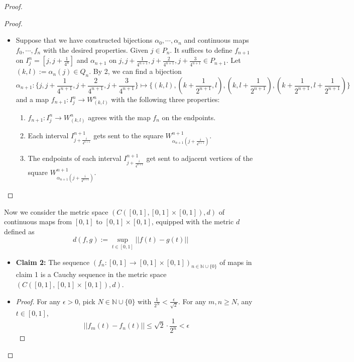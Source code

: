 \begin{proof}
\begin{itemize}
\begin{proof}
\begin{itemize}
                \item Suppose that we have constructed bijections $\alpha_0 ,\cdots, \alpha_n$ and continuous maps $f_0 ,\cdots, f_n$ with the desired properties. Given $j \in P_n$. It suffices to define $f_{n+1}$ on $I_j^n= [j,j+ \frac{1}{4^n}]$ and $\alpha_{n+1}$ on $j, j+\frac{1}{4^{n+1}}, j+\frac{2}{4^{n+1}}, j+\frac{3}{4^{n+1}} \in P_{n+1}$. Let $(k,l) := \alpha_n(j) \in Q_n$. By 2, we can find a bijection
                $$\alpha_{n+1} : \{ j, j+\frac{1}{4^{n+1}}, j+\frac{2}{4^{n+1}}, j+\frac{3}{4^{n+1}} \} \mapsto \{ (k,l),(k+ \frac{1}{2^{n+1}}, l),(k, l + \frac{1}{2^{n+1}}), (k+ \frac{1}{2^{n+1}}, l + \frac{1}{2^{n+1}}) \}$$
                and a map $f_{n+1}: I_j^n \to W_{(k,l)}^n$ with the following three properties:
                \begin{enumerate}[label=\Roman*]
                    \item $f_{n+1}: I_j^n \to W_{(k,l)}^n$ agrees with the map $f_n$ on the endpoints.
                    \item Each interval $I_{j+ \frac{i}{4^{n+1}}}^{n+1}$ gets sent to the square $W_{\alpha_{n+1}(j + \frac{i}{4^{n+1}})}^{n+1}$.
                    \item The endpoints of each interval $I_{j+ \frac{i}{4^{n+1}}}^{n+1}$ get sent to adjacent vertices of the square $W_{\alpha_{n+1}(j + \frac{i}{4^{n+1}})}^{n+1}$.
                \end{enumerate}
            \end{itemize}
        \end{proof}
    \end{itemize}

    Now we consider the metric space $(C([0,1], [0,1]\times [0,1]),d)$ of continuous maps from $[0,1]$ to $[0,1] \times [0,1]$, equipped with the metric $d$ defined as
    $$d(f,g) := \sup_{t \in [0,1]} ||f(t)-g(t)||$$

    \begin{itemize}
        \item \textbf{Claim 2:} The sequence $(f_n : [0,1] \to [0,1] \times [0,1])_{n \in \mathbb{N} \cup \{0\}}$ of maps in claim 1 is a Cauchy sequence in the metric space $(C([0,1], [0,1]\times [0,1]),d)$.
        \item \begin{proof}
            For any $\epsilon>0$, pick $N \in \mathbb{N} \cup \{0\}$ with $\frac{1}{2^N} < \frac{\epsilon}{\sqrt{2}}$. For any $m,n \geq N$, any $t \in [0,1]$,
            $$||f_m(t) - f_n(t)|| \leq \sqrt{2} \cdot \frac{1}{2^n} < \epsilon$$
        \end{proof}
    \end{itemize}


\end{proof}
